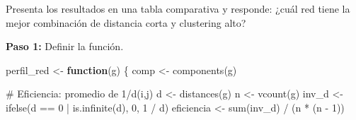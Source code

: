 \documentclass[
  letterpaper,
  DIV=11,
  numbers=noendperiod]{scrreprt}
\newenvironment{Shaded}{\begin{snugshade}}{\end{snugshade}}
\newcommand{\CommentTok}[1]{\textcolor[rgb]{0.37,0.37,0.37}{#1}}
\newcommand{\ControlFlowTok}[1]{\textcolor[rgb]{0.00,0.23,0.31}{\textbf{#1}}}
\newcommand{\DecValTok}[1]{\textcolor[rgb]{0.68,0.00,0.00}{#1}}
\newcommand{\FunctionTok}[1]{\textcolor[rgb]{0.28,0.35,0.67}{#1}}
\newcommand{\NormalTok}[1]{\textcolor[rgb]{0.00,0.23,0.31}{#1}}
\newcommand{\OtherTok}[1]{\textcolor[rgb]{0.00,0.23,0.31}{#1}}
\newcommand{\SpecialCharTok}[1]{\textcolor[rgb]{0.37,0.37,0.37}{#1}}
\begin{document}
Presenta los resultados en una tabla comparativa y responde: ¿cuál red
tiene la mejor combinación de distancia corta y clustering alto?

\begin{tcolorbox}[enhanced jigsaw, toprule=.15mm, colframe=quarto-callout-tip-color-frame, coltitle=black, titlerule=0mm, colback=white, breakable, leftrule=.75mm, arc=.35mm, bottomtitle=1mm, toptitle=1mm, rightrule=.15mm, bottomrule=.15mm, left=2mm, title=\textcolor{quarto-callout-tip-color}{\faLightbulb}\hspace{0.5em}{📝 Solución}, colbacktitle=quarto-callout-tip-color!10!white, opacityback=0, opacitybacktitle=0.6]

\textbf{Paso 1:} Definir la función.

\begin{Shaded}
\begin{Highlighting}[]
\NormalTok{perfil\_red }\OtherTok{\textless{}{-}} \ControlFlowTok{function}\NormalTok{(g) \{}
\NormalTok{  comp }\OtherTok{\textless{}{-}} \FunctionTok{components}\NormalTok{(g)}
  
  \CommentTok{\# Eficiencia: promedio de 1/d(i,j)}
\NormalTok{  d }\OtherTok{\textless{}{-}} \FunctionTok{distances}\NormalTok{(g)}
\NormalTok{  n }\OtherTok{\textless{}{-}} \FunctionTok{vcount}\NormalTok{(g)}
\NormalTok{  inv\_d }\OtherTok{\textless{}{-}} \FunctionTok{ifelse}\NormalTok{(d }\SpecialCharTok{==} \DecValTok{0} \SpecialCharTok{|} \FunctionTok{is.infinite}\NormalTok{(d), }\DecValTok{0}\NormalTok{, }\DecValTok{1} \SpecialCharTok{/}\NormalTok{ d)}
\NormalTok{  eficiencia }\OtherTok{\textless{}{-}} \FunctionTok{sum}\NormalTok{(inv\_d) }\SpecialCharTok{/}\NormalTok{ (n }\SpecialCharTok{*}\NormalTok{ (n }\SpecialCharTok{{-}} \DecValTok{1}\NormalTok{))}
  

\end{Highlighting}
\end{Shaded}
\end{tcolorbox}
\end{document}
